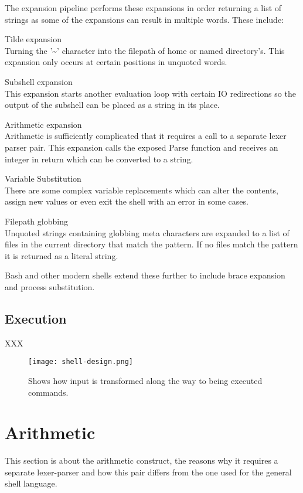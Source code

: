 The expansion pipeline performs these expansions in order returning a list of strings as some of the expansions can result in multiple words.
These include:
\begin{description*}
	\item Tilde expansion \hfill \\
    	Turning the '\textasciitilde' character into the filepath of home or named directory's.
    	This expansion only occurs at certain positions in unquoted words.
    \item Subshell expansion \hfill \\
    	This expansion starts another evaluation loop with certain IO redirections so the output of the subshell can be placed as a string in its place.
	\item Arithmetic expansion \hfill \\
    	Arithmetic is sufficiently complicated that it requires a call to a separate lexer parser pair.
        This expansion calls the exposed Parse function and receives an integer in return which can be converted to a string.
    \item Variable Substitution \hfill \\
    	There are some complex variable replacements which can alter the contents, assign new values or even exit the shell with an error in some cases.
	\item Filepath globbing \hfill \\
    	Unquoted strings containing globbing meta characters are expanded to a list of files in the current directory that match the pattern.
        If no files match the pattern it is returned as a literal string.
\end{description*}

Bash and other modern shells extend these further to include brace expansion and process substitution.

\subsection{Execution}

XXX

\begin{figure}[hp]
    \centering
    \texttt{[image: shell-design.png]}
    \caption[Shell execution pipeline]{Shows how input is transformed along the way to being executed commands.}
    \label{fig:shell-flowchart}
\end{figure}

\section{Arithmetic}
This section is about the arithmetic construct, the reasons why it requires a separate lexer-parser and how this pair differs from the one used for the general shell language.

